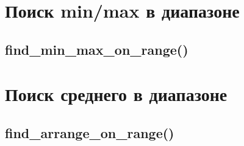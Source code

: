 \documentclass[12pt, a4paper]{article}
\begin{document}







\section{Поиск min/max в диапазоне}

\subsection{find\_min\_max\_on\_range()}







\section{Поиск среднего в диапазоне}



\subsection{find\_arrange\_on\_range()}




\end{document}
